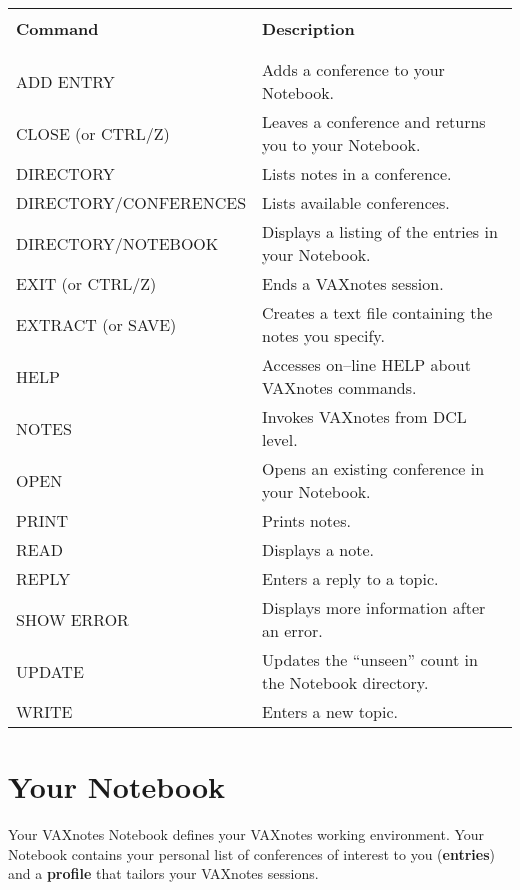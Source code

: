 \begin{tabular}{ l l }
& \\
\hline
& \\
{\large \bf Command}  & {\large \bf Description} \\
& \\
\hline
& \\
ADD ENTRY                &Adds a conference to your Notebook.\\
CLOSE (or CTRL/Z)        &Leaves a conference and returns you to your Notebook.\\
DIRECTORY                &Lists notes in a conference.\\
DIRECTORY/CONFERENCES    &Lists available conferences.\\
DIRECTORY/NOTEBOOK       &Displays a listing of the entries in your Notebook.\\
EXIT (or CTRL/Z)         &Ends a VAXnotes session.\\
EXTRACT (or SAVE)        &Creates a text file containing the notes you specify.\\
HELP                     &Accesses on--line HELP about VAXnotes commands.\\
NOTES                    &Invokes VAXnotes from DCL level.\\
OPEN                     &Opens an existing conference in your Notebook.\\
PRINT                    &Prints notes.\\
READ                     &Displays a note.\\
REPLY                    &Enters a reply to a topic.\\
SHOW ERROR               &Displays more information after an error.\\
UPDATE                   &Updates the ``unseen'' count in the Notebook directory.\\
WRITE                    &Enters a new topic.\\

\end{tabular}

\section {Your Notebook}

Your VAXnotes Notebook defines your VAXnotes working environment. Your Notebook
contains your personal list of conferences of interest to you ({\bf entries})
and a {\bf profile} that tailors your VAXnotes sessions.


